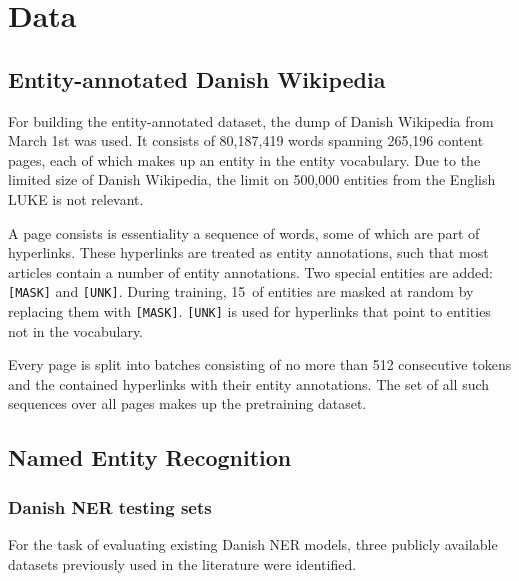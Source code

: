 \documentclass[main.tex]{subfiles}
\begin{document}
\chapter{Data}

\section{Entity-annotated Danish Wikipedia}
For building the entity-annotated dataset, the dump of Danish Wikipedia from March 1st was used.
It consists of 80,187,419 words spanning 265,196 content pages, each of which makes up an entity in the entity vocabulary.
Due to the limited size of Danish Wikipedia, the limit on 500,000 entities from the English LUKE is not relevant.

A page consists is essentiality a sequence of words, some of which are part of hyperlinks.
These hyperlinks are treated as entity annotations, such that most articles contain a number of entity annotations.
Two special entities are added: \texttt{[MASK]} and \texttt{[UNK]}.
During training, 15\pro\ of entities are masked at random by replacing them with \texttt{[MASK]}.
\texttt{[UNK]} is used for hyperlinks that point to entities not in the vocabulary.

Every page is split into batches consisting of no more than 512 consecutive tokens and the contained hyperlinks with their entity annotations.
The set of all such sequences over all pages makes up the pretraining dataset.

\section{Named Entity Recognition}

\subsection{Danish NER testing sets}
\label{subsec:daNERdata}
For the task of evaluating existing Danish NER models, three publicly available datasets previously used in the literature were identified.
\end{document}
